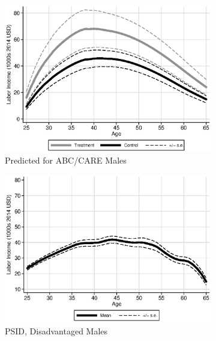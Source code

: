 \begin{figure}
\centering
\caption{Labor Income Profiles, Prediction Based on Lagged Labor Income and $\bm{X}_{t},\bm{B}$}\label{fig:labor-income-profiles}
\begin{subfigure}[h]{0.4\textwidth}
		\centering
		\caption{Predicted for ABC/CARE Males} \label{fig:abcare1}
		\includegraphics[width=\textwidth]{output/labor_25-60_male_1.eps}
\end{subfigure}%
\begin{subfigure}[h]{0.4\textwidth}
	\centering
	\caption{PSID, Disadvantaged Males} \label{fig:psid1}
		\includegraphics[width=\textwidth]{output/psid_incomeprofiles_s1.eps}
\end{subfigure}
\begin{subfigure}[h]{0.4\textwidth}

\end{subfigure}
\end{figure}
